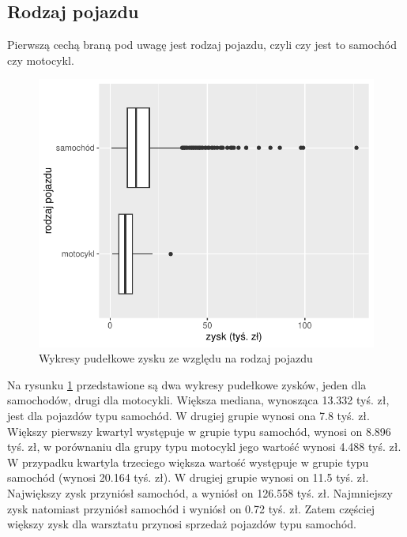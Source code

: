 \documentclass{article}\usepackage[]{graphicx}\usepackage[]{xcolor}
\makeatletter
\def\maxwidth{ %
  \ifdim\Gin@nat@width>\linewidth
    \linewidth
  \else
    \Gin@nat@width
  \fi
}
\newenvironment{knitrout}{}{} %
\makeatother
\begin{document}
\subsection{Rodzaj pojazdu}

Pierwszą cechą braną pod uwagę jest rodzaj pojazdu, czyli czy jest to samochód czy motocykl.

\begin{knitrout}
\color{fgcolor}\begin{figure}[H]

{\centering \includegraphics[width=\maxwidth]{figure/fig_typ-1} 

}

\caption[Wykresy pudełkowe zysku ze względu na rodzaj pojazdu]{Wykresy pudełkowe zysku ze względu na rodzaj pojazdu}\label{fig:fig_typ}
\end{figure}

\end{knitrout}

Na rysunku \ref{fig:fig_typ} przedstawione są dwa wykresy pudełkowe zysków, jeden dla samochodów, drugi dla motocykli. Większa mediana, wynosząca 13.332 tyś. zł, jest dla pojazdów typu samochód. W drugiej grupie wynosi ona 7.8 tyś. zł. 
Większy pierwszy kwartyl występuje w grupie typu samochód, wynosi on 8.896 tyś. zł, w porównaniu dla grupy typu motocykl jego wartość wynosi 4.488 tyś. zł.
W przypadku kwartyla trzeciego większa wartość występuje w grupie typu samochód (wynosi 20.164 tyś. zł). W drugiej grupie wynosi on 11.5 tyś. zł.
Największy zysk przyniósł samochód, a wyniósł on 126.558 tyś. zł. 
Najmniejszy zysk natomiast przyniósł samochód i wyniósł on 0.72 tyś. zł. Zatem częściej większy zysk dla warsztatu przynosi sprzedaż pojazdów typu samochód. 
\end{document}

